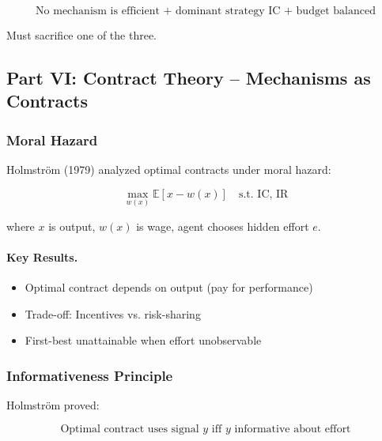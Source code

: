 \begin{equation}
\boxed{
\text{No mechanism is efficient + dominant strategy IC + budget balanced}
}
\label{eq:green-laffont}
\end{equation}

Must sacrifice one of the three.

\subsection{Part VI: Contract Theory – Mechanisms as Contracts}

\subsubsection{Moral Hazard}

Holmström (1979) analyzed optimal contracts under moral hazard:

\begin{equation}
\boxed{
\max_{w(x)} \mathbb{E}[x - w(x)] \quad \text{s.t. IC, IR}
}
\label{eq:moral-hazard}
\end{equation}

where $x$ is output, $w(x)$ is wage, agent chooses hidden effort $e$.

\paragraph{Key Results.}
\begin{itemize}
    \item Optimal contract depends on output (pay for performance)
    \item Trade-off: Incentives vs. risk-sharing
    \item First-best unattainable when effort unobservable
\end{itemize}

\subsubsection{Informativeness Principle}

Holmström proved:

\begin{equation}
\boxed{
\text{Optimal contract uses signal } y \text{ iff } y \text{ informative about effort}
}
\label{eq:informativeness}
\end{equation}


